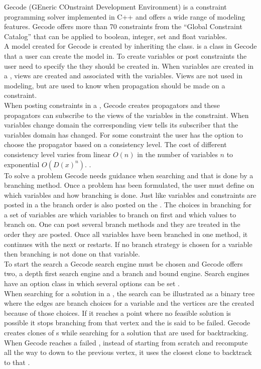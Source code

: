 Gecode (GEneric COnstraint Development Environment) is a constraint programming solver implemented in C++ and 
offers a wide range of modeling features. Gecode offers more than 70 constraints from the ``Global Constraint Catalog'' 
\cite{url_globalCons} that can be applied to boolean, integer, set and float variables. \\ 
A model created for Gecode is created by inheriting the  class.  is a class in Gecode that 
a user can create the model in. To create variables or post constraints the user need to specify the  they 
should be created in. When variables are created in a , views are created and associated with the 
variables. Views are not used in modeling, but are used to know when propagation should be made on a constraint. \\ 
When posting constraints in a , Gecode creates propagators and these propagators can subscribe to the views 
of the variables in the constraint. When variables change domain the corresponding view tells its subscriber that the 
variables domain has changed. For some constraint the user has the option to choose the propagator based on a 
consistency level. The cost of different consistency level varies from linear $O(n)$ in the number of variables $n$ to 
exponential $O(D(x)^n)$. \cite[p.57]{MPG:M}. \\
To solve a problem Gecode needs guidance when searching and that is done by a branching method. Once a problem 
has been formulated, the user must define on which variables and how branching is done. Just like variables and 
constraints are posted in a  the branch order is also posted on the . The choices in branching 
for a set of variables are which variables to branch on first and which values to branch on. One can post several branch 
methods and they 
are treated in the order they are posted. Once all variables have been branched in one  method, it 
continues with the next  or restarts.  If no branch strategy is chosen for a variable then branching is 
not done on that variable. \\ 
To start the search a Gecode search engine must be chosen and Gecode offers two, a depth first search engine and a 
branch and bound engine. Search engines have an option class in which several options can be set \cite[p.157]{MPG:M}. 
\\ 
When searching for a solution in a , the search can be illustrated as a binary tree where the edges are 
branch choices for a variable and the vertices are the  created because of those choices. If it reaches a 
point where no feasible solution is possible it stops branching from that vertex and the  is said to be 
failed. Gecode creates clones of s while searching for a solution that are used for backtracking. When 
Gecode reaches a failed , instead of starting from scratch and recompute all the way to down to the 
previous vertex, it uses the closest clone to backtrack to that . \\